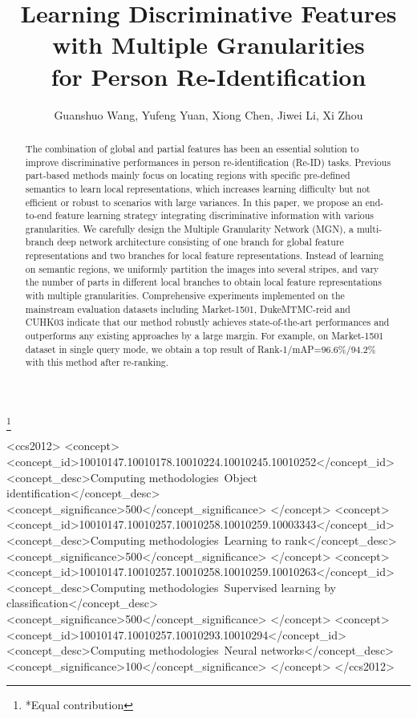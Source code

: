 \documentclass[sigconf]{acmart}
\begin{document}
\title{Learning Discriminative Features with Multiple Granularities \\ for Person Re-Identification}
\author{
	Guanshuo Wang, 
	Yufeng Yuan,
	Xiong Chen,
	Jiwei Li, 
	Xi Zhou
}
\thanks{*Equal contribution}
\renewcommand{\shortauthors}{G. Wang et al.}


\begin{abstract}
	The combination of global and partial features has been an essential solution to improve discriminative performances in person re-identification (Re-ID) tasks. Previous part-based methods mainly focus on locating regions with specific pre-defined semantics to learn local representations, which increases learning difficulty but not efficient or robust to scenarios with large variances. In this paper, we propose an end-to-end feature learning strategy integrating discriminative information with various granularities. We carefully design the Multiple Granularity Network (MGN), a multi-branch deep network architecture consisting of one branch for global feature representations and two branches for local feature representations. Instead of learning on semantic regions, we uniformly partition the images into several stripes, and vary the number of parts in different local branches to obtain local feature representations with multiple granularities. Comprehensive experiments implemented on the mainstream evaluation datasets including Market-1501, DukeMTMC-reid and CUHK03 indicate that our method robustly achieves state-of-the-art performances and outperforms any existing approaches by a large margin. For example, on Market-1501 dataset in single query mode, we obtain a top result of Rank-1/mAP=96.6\%/94.2\% with this method after re-ranking.
\end{abstract}

\begin{CCSXML}
	<ccs2012>
	<concept>
	<concept_id>10010147.10010178.10010224.10010245.10010252</concept_id>
	<concept_desc>Computing methodologies~Object identification</concept_desc>
	<concept_significance>500</concept_significance>
	</concept>
	<concept>
	<concept_id>10010147.10010257.10010258.10010259.10003343</concept_id>
	<concept_desc>Computing methodologies~Learning to rank</concept_desc>
	<concept_significance>500</concept_significance>
	</concept>
	<concept>
	<concept_id>10010147.10010257.10010258.10010259.10010263</concept_id>
	<concept_desc>Computing methodologies~Supervised learning by classification</concept_desc>
	<concept_significance>500</concept_significance>
	</concept>
	<concept>
	<concept_id>10010147.10010257.10010293.10010294</concept_id>
	<concept_desc>Computing methodologies~Neural networks</concept_desc>
	<concept_significance>100</concept_significance>
	</concept>
	</ccs2012>
\end{CCSXML}
\end{document}
